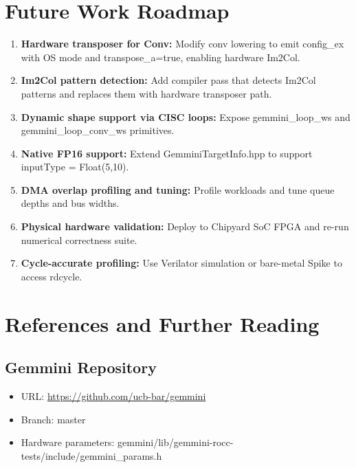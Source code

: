 \documentclass[12pt,a4paper]{article}
\begin{document}
\section{Future Work Roadmap}

\begin{enumerate}[leftmargin=*]
    \item \textbf{Hardware transposer for Conv:} Modify conv lowering to emit config\_ex with OS mode and transpose\_a=true, enabling hardware Im2Col.

    \item \textbf{Im2Col pattern detection:} Add compiler pass that detects Im2Col patterns and replaces them with hardware transposer path.

    \item \textbf{Dynamic shape support via CISC loops:} Expose gemmini\_loop\_ws and gemmini\_loop\_conv\_ws primitives.

    \item \textbf{Native FP16 support:} Extend GemminiTargetInfo.hpp to support inputType = Float(5,10).

    \item \textbf{DMA overlap profiling and tuning:} Profile workloads and tune queue depths and bus widths.

    \item \textbf{Physical hardware validation:} Deploy to Chipyard SoC FPGA and re-run numerical correctness suite.

    \item \textbf{Cycle-accurate profiling:} Use Verilator simulation or bare-metal Spike to access rdcycle.
\end{enumerate}

\section{References and Further Reading}

\subsection{Gemmini Repository}

\begin{itemize}[leftmargin=*]
    \item URL: \url{https://github.com/ucb-bar/gemmini}
    \item Branch: master
    \item Hardware parameters: gemmini/lib/gemmini-rocc-tests/include/gemmini\_params.h
\end{itemize}
\end{document}
